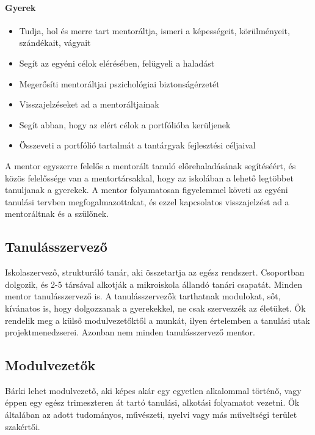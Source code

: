   \paragraph{Gyerek}

  \begin{itemize}
    \item  Tudja, hol és merre tart mentoráltja, ismeri a képességeit, körülményeit, szándékait, vágyait
    \item    Segít az egyéni célok elérésében, felügyeli a haladást
    \item    Megerősíti mentoráltjai pszichológiai biztonságérzetét
    \item   Visszajelzéseket ad a mentoráltjainak
    \item    Segít abban, hogy az elért célok a portfólióba kerüljenek
    \item    Összeveti a portfólió tartalmát a tantárgyak fejlesztési céljaival
\end{itemize}


  A mentor egyszerre felelős a mentorált tanuló előrehaladásának segítéséért, és
  közös felelőssége van a mentortársakkal, hogy az iskolában a lehető legtöbbet
  tanuljanak a gyerekek. A mentor folyamatosan figyelemmel követi az egyéni
  tanulási tervben megfogalmazottakat, és ezzel kapcsolatos visszajelzést ad a
  mentoráltnak és a szülőnek.

  \subsection{Tanulásszervező}
  Iskolaszervező, strukturáló tanár, aki összetartja az egész rendszert.
  Csoportban dolgozik, és 2-5 társával alkotják a mikroiskola állandó tanári
  csapatát. Minden mentor tanulásszervező is. A tanulásszervezők tarthatnak
  modulokat, sőt, kívánatos is, hogy dolgozzanak a gyerekekkel, ne csak szervezzék az életüket.
  Ők rendelik meg a külső modulvezetőktől a munkát, ilyen értelemben a
  tanulási utak projektmenedzserei. Azonban nem minden tanulásszervező mentor.

  \subsection{Modulvezetők}

  Bárki lehet modulvezető, aki képes akár egy egyetlen alkalommal történő, vagy éppen
  egy egész trimeszteren át tartó tanulási, alkotási folyamatot vezetni. Ők általában
  az adott tudományos, művészeti, nyelvi vagy más műveltségi terület szakértői.

